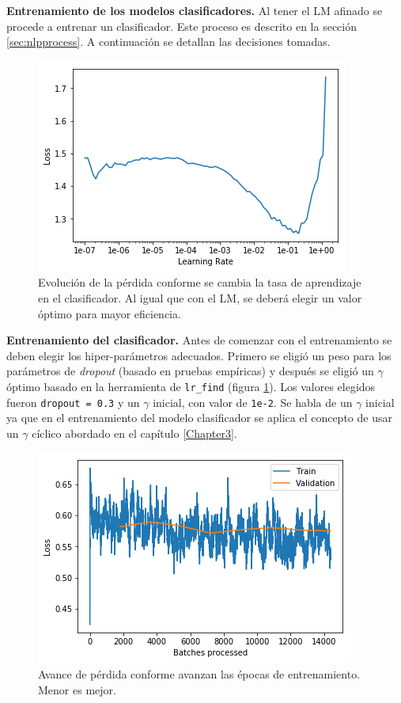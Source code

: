 \textbf{Entrenamiento de los modelos clasificadores.} Al tener el LM afinado se procede a entrenar un clasificador. Este proceso es descrito en la sección \ref{sec:nlpprocess}. A continuación se detallan las decisiones tomadas.

\begin{figure}
\centering
\includegraphics[scale=1]{Figures/clas_lrfinder.png}
\caption{Evolución de la pérdida conforme se cambia la tasa de aprendizaje en el clasificador. Al igual que con el LM, se deberá elegir un valor óptimo para mayor eficiencia.}
\label{fig:claslr}
\end{figure}

\textbf{Entrenamiento del clasificador.} Antes de comenzar con el entrenamiento se deben elegir los hiper-parámetros adecuados. Primero se eligió un peso para los parámetros de \textit{dropout} (basado en pruebas empíricas) y después se eligió un $\gamma$ óptimo basado en la herramienta de \texttt{lr\_find} (figura \ref{fig:claslr}). Los valores elegidos fueron \texttt{dropout = 0.3} y un $\gamma$ inicial, con valor de \texttt{1e-2}. Se habla de un $\gamma$ inicial ya que en el entrenamiento del modelo clasificador se aplica el concepto de usar un $\gamma$ cíclico \parencite{smith2017convergence} abordado en el capítulo \ref{Chapter3}.

\begin{figure}
\centering
\includegraphics[scale=1]{Figures/clas_epochs.png}
\caption{Avance de pérdida conforme avanzan las épocas de entrenamiento. Menor es mejor.}
\label{fig:clasepochs}
\end{figure}

